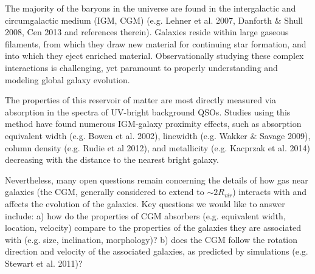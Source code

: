 \documentclass[12pt]{article}
\begin{document}
%
%
\justification          %


\indent \indent The majority of the baryons in the universe are found in the intergalactic and circumgalactic medium (IGM, CGM) (e.g. Lehner et al. 2007, Danforth $\&$ Shull 2008, Cen 2013 and references therein). Galaxies reside within large gaseous filaments, from which they draw new material for continuing star formation, and into which they eject enriched material. Observationally studying these complex interactions is challenging, yet paramount to properly understanding and modeling global galaxy evolution.

The properties of this reservoir of matter are most directly measured via absorption in the spectra of UV-bright background QSOs. Studies using this method have found numerous IGM-galaxy proximity effects, such as absorption equivalent width (e.g. Bowen et al. 2002), linewidth (e.g. Wakker $\&$ Savage 2009), column density (e.g. Rudie et al 2012), and metallicity (e.g. Kacprzak et al. 2014) decreasing with the distance to the nearest bright galaxy. 

Nevertheless, many open questions remain concerning the details of how gas near galaxies (the CGM, generally considered to extend to $\sim 2R_{vir}$) interacts with and affects the evolution of the galaxies. Key questions we would like to answer include:
a) how do the properties of CGM absorbers (e.g. equivalent width, location, velocity) compare to the properties of the galaxies they are associated with (e.g. size, inclination, morphology)?
b) does the CGM follow the rotation direction and velocity of the associated galaxies, as predicted by simulations (e.g. Stewart et al. 2011)?
\end{document}
